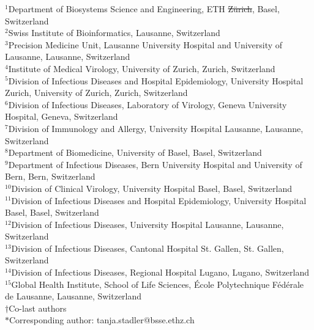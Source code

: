 \documentclass[11pt]{article} %
\providecommand{\DIFadd}[1]{{\protect\color{blue}\uwave{#1}}} %
\providecommand{\DIFdel}[1]{{\protect\color{red}\sout{#1}}}                      %
\providecommand{\DIFaddbegin}{} %
\providecommand{\DIFaddend}{} %
\providecommand{\DIFdelbegin}{} %
\providecommand{\DIFdelend}{} %
\newcommand{\DIFscaledelfig}{0.5}
\newlength{\DIFdelgraphicswidth} %
\newlength{\DIFdelgraphicsheight} %
\newcommand{\DIFaddincludegraphics}[2][]{{\color{blue}\fbox{\DIFOincludegraphics[#1]{#2}}}} %
\newcommand{\DIFdelincludegraphics}[2][]{%
\sbox{\DIFdelgraphicsbox}{\DIFOincludegraphics[#1]{#2}}%
\settoboxwidth{\DIFdelgraphicswidth}{\DIFdelgraphicsbox} %
\settoboxtotalheight{\DIFdelgraphicsheight}{\DIFdelgraphicsbox} %
\scalebox{\DIFscaledelfig}{%
\parbox[b]{\DIFdelgraphicswidth}{\usebox{\DIFdelgraphicsbox}\\[-\baselineskip] \rule{\DIFdelgraphicswidth}{0em}}\llap{\resizebox{\DIFdelgraphicswidth}{\DIFdelgraphicsheight}{%
\setlength{\unitlength}{\DIFdelgraphicswidth}%
\begin{picture}(1,1)%
\thicklines\linethickness{2pt} %
{\color[rgb]{1,0,0}\put(0,0){\framebox(1,1){}}}%
{\color[rgb]{1,0,0}\put(0,0){\line( 1,1){1}}}%
{\color[rgb]{1,0,0}\put(0,1){\line(1,-1){1}}}%
\end{picture}%
}\hspace*{3pt}}} %
} %
\DeclareRobustCommand{\DIFaddbegin}{\DIFOaddbegin \let\includegraphics\DIFaddincludegraphics} %
\DeclareRobustCommand{\DIFaddend}{\DIFOaddend \let\includegraphics\DIFOincludegraphics} %
\DeclareRobustCommand{\DIFdelbegin}{\DIFOdelbegin \let\includegraphics\DIFdelincludegraphics} %
\DeclareRobustCommand{\DIFdelend}{\DIFOaddend \let\includegraphics\DIFOincludegraphics} %
\begin{document}
\noindent
$^{1}$Department of Biosystems Science and Engineering, ETH \DIFdelbegin \DIFdel{Zürich}\DIFdelend \DIFaddbegin \DIFadd{Zurich}\DIFaddend , Basel, Switzerland\\
$^{2}$Swiss Institute of Bioinformatics, Lausanne, Switzerland\\ 
$^{3}$Precision Medicine Unit, Lausanne University Hospital and University of Lausanne, Lausanne, Switzerland\\ 
$^{4}$Institute of Medical Virology, University of Zurich, Zurich, Switzerland\\ 
$^{5}$Division of Infectious Diseases and Hospital Epidemiology, University Hospital Zurich, University of Zurich, Zurich, Switzerland\\
$^{6}$Division of Infectious Diseases, Laboratory of Virology, Geneva University Hospital, Geneva, Switzerland\\
$^{7}$Division of Immunology and Allergy, University Hospital Lausanne, Lausanne, Switzerland\\
$^{8}$Department of Biomedicine, University of Basel, Basel, Switzerland\\
$^{9}$Department of Infectious Diseases, Bern University Hospital and University of Bern, Bern, Switzerland\\
$^{10}$Division of Clinical Virology, University Hospital Basel, Basel, Switzerland\\
$^{11}$Division of Infectious Diseases and Hospital Epidemiology, University Hospital Basel, Basel, Switzerland\\
$^{12}$Division of Infectious Diseases, University Hospital Lausanne, Lausanne, Switzerland\\
$^{13}$Division of Infectious Diseases, Cantonal Hospital St. Gallen, St. Gallen, Switzerland\\
$^{14}$Division of Infectious Diseases, Regional Hospital Lugano, Lugano, Switzerland\\
$^{15}$Global Health Institute, School of Life Sciences, École Polytechnique Fédérale de Lausanne, Lausanne, Switzerland\\
$\dagger$Co-last authors\\
$*$Corresponding author: tanja.stadler@bsse.ethz.ch
\end{document}
